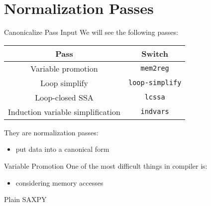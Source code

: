 \documentclass[10pt,mathserif]{beamer}
\newcommand{\llvminput}[1]{}
\begin{document}
\section{Normalization Passes}
\begin{frame}{Canonicalize Pass Input}
We will see the following passes:

\begin{table}
\centering
\begin{tabular}{cc}
\toprule

\multicolumn{1}{c}{\textbf{Pass}}    &
\multicolumn{1}{c}{\textbf{Switch}} \\

\midrule

Variable promotion  &
\texttt{mem2reg}   \\ 

Loop simplify           &
\texttt{loop-simplify} \\ 

Loop-closed SSA  &
\texttt{lcssa}  \\

Induction variable simplification  &
\texttt{indvars}                  \\

\bottomrule
\end{tabular}
\end{table}

They are \alert{normalization} passes:

\begin{itemize}
\item put data into a canonical form
\end{itemize}
\end{frame}

\begin{frame}{Variable Promotion}
One of the most difficult things in compiler is:

\begin{itemize}
\item considering memory accesses
\end{itemize}

\begin{block}{Plain SAXPY}
\centering
\llvminput{snippet/02/plain-saxpy.ll}
\end{block}
\end{frame}
\end{document}
